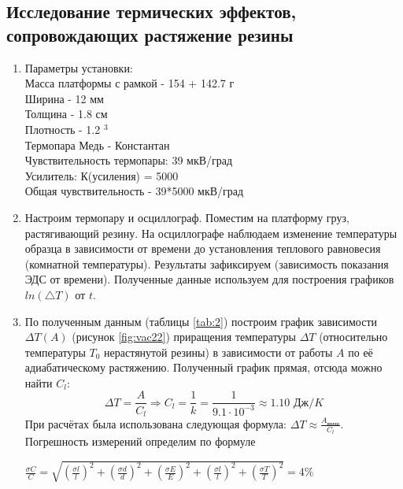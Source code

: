 \documentclass[a4paper,11.5pt]{article} %
\begin{document}
\subsection{Исследование термических эффектов, сопровождающих растяжение резины}

\begin{enumerate}
    \item Параметры установки: \\
    
    Масса платформы с рамкой - 154 + 142.7 г\\
    Ширина - 12 мм\\
    Толщина - 1.8 см\\
    Плотность - 1.2  $^3$ \\
    Термопара Медь - Константан\\
    Чувствительность термопары: 39 мкВ/град \\
    Усилитель: К(усиления) =  5000\\
    Общая чувствительность - 39*5000 мкВ/град \\
    
    

    \item Настроим термопару и осциллограф. Поместим на платформу груз, растягивающий резину. На осциллографе наблюдаем изменение температуры образца в зависимости от времени до установления теплового равновесия (комнатной температуры). Результаты зафиксируем (зависимость показания ЭДС от времени). Полученные данные используем для построения графиков $ln(\triangle T)$ от $t$.
    
	\item По полученным данным (таблицы \ref{tab:2}) построим график зависимости $\Delta T(A)$ (рисунок \ref{fig:vac22}) приращения температуры $\Delta T $ (относительно температуры $T_0$ нерастянутой резины) в зависимости от работы $A$ по её адиабатическому растяжению. Полученный график прямая, отсюда можно найти $C_l$:
	\[ \Delta T = \frac{A}{C_l} \Rightarrow C_l = \frac{1}{k} = \frac{1}{9.1 \cdot 10^{-3}} \approx 1.10 \text{ Дж}/K \] 
	При расчётах была использована следующая формула: $\Delta T \approx \frac{A_{\text{внеш}}}{C_l}$. Погрешность измерений определим по формуле
    \begin{center}
    $\frac{\sigma C}{C} = \sqrt{(\frac{\sigma l}{l})^2 + (\frac{\sigma d}{d})^2 + (\frac{\sigma E}{E})^2 + (\frac{\sigma l}{l})^2 + (\frac{\sigma T}{T})^2} = 4 \%$
    \end{center}  
    

\end{enumerate}
\end{document}
